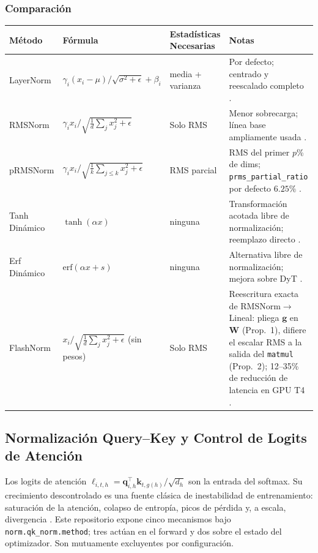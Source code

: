 \subsubsection{Comparación}
\scriptsize
\begin{longtable}{L{2.2cm}L{3.4cm}L{2.0cm}L{4.0cm}}
\toprule
\textbf{Método} & \textbf{Fórmula} & \textbf{Estadísticas Necesarias} & \textbf{Notas} \\
\midrule
\endhead
LayerNorm & $\gamma_i (x_i - \mu)/\sqrt{\sigma^2 + \epsilon} + \beta_i$ & media + varianza & Por defecto; centrado y reescalado completo \citep{ba2016layer}. \\
RMSNorm & $\gamma_i x_i/\sqrt{\frac{1}{d}\sum_j x_j^2+\epsilon}$ & Solo RMS & Menor sobrecarga; línea base ampliamente usada \citep{zhang_root_2019}. \\
pRMSNorm & $\gamma_i x_i/\sqrt{\frac{1}{k}\sum_{j\le k} x_j^2+\epsilon}$ & RMS parcial & RMS del primer $p$\% de dims; \texttt{prms\_partial\_ratio} por defecto $6.25\%$ \citep{zhang_root_2019}. \\
Tanh Dinámico & $\tanh(\alpha x)$ & ninguna & Transformación acotada libre de normalización; reemplazo directo \citep{zhu_transformers_2025}. \\
Erf Dinámico & $\mathrm{erf}(\alpha x+s)$ & ninguna & Alternativa libre de normalización; mejora sobre DyT \citep{chen_stronger_2025}. \\
FlashNorm & $x_i/\sqrt{\frac{1}{d}\sum_j x_j^2+\epsilon}$ (sin pesos) & Solo RMS & Reescritura exacta de RMSNorm$\to$Lineal: pliega $\mathbf{g}$ en $\mathbf{W}$ (Prop.~1), difiere el escalar RMS a la salida del \texttt{matmul} (Prop.~2); 12--35\% de reducción de latencia en GPU T4 \citep{graef2026flashnorm}. \\
\bottomrule
\end{longtable}
\normalsize

\subsection{Normalización Query--Key y Control de Logits de Atención}
\label{sec:annex-qk-norm-es}

Los logits de atención $\ell_{i,t,h} = \mathbf{q}_{i,h}^\top \mathbf{k}_{t,g(h)} / \sqrt{d_h}$ son la entrada del softmax. Su crecimiento descontrolado es una fuente clásica de inestabilidad de entrenamiento: saturación de la atención, colapso de entropía, picos de pérdida y, a escala, divergencia \citep{henry2020querykey,kimi2025k2}. Este repositorio expone cinco mecanismos bajo \texttt{norm.qk\_norm.method}; tres actúan en el forward y dos sobre el estado del optimizador. Son mutuamente excluyentes por configuración.

